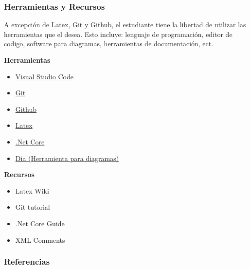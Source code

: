 \documentclass{beamer}
\begin{document}
\begin{frame}
\frametitle{Herramientas y Recursos}
A excepci\'on de Latex, Git y Github, el estudiante tiene la libertad de
utilizar las herramientas que el desea. Esto incluye: lenguaje de programaci\'on,
editor de codigo, software para diagramas, herramientas de documentaci\'on, ect.

\begin{multicols*}{2}
    {\bf Herramientas} \\
\begin{itemize}
    \item \href{https://code.visualstudio.com/}{Visual Studio Code}
    \item \href{https://git-scm.com/}{Git}
    \item \href{https://github.com/}{Github}
    \item \href{https://www.latex-project.org/}{Latex}
    \item \href{https://dotnet.github.io/}{.Net Core}
    \item \href{https://wiki.gnome.org/Apps/Dia}{Dia (Herramienta para diagramas)}

\end{itemize}
\columnbreak
{\bf Recursos}
\begin{itemize}
    \item Latex Wiki \cite{Latex}
    \item Git tutorial \cite{GitTutorial}
    \item .Net Core Guide \cite{DotNetGuide}
    \item XML Comments \cite{XmlDoc}
\end{itemize}
\end{multicols*}
\end{frame}

\begin{frame}
\frametitle{Referencias}


\end{frame}
\end{document}
